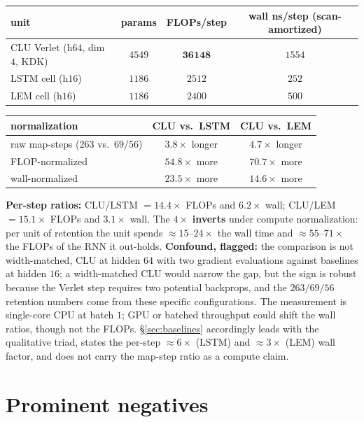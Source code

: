\documentclass{article}
\begin{document}
\begin{center}\footnotesize
\begin{tabular}{lccc}
\toprule
unit & params & FLOPs/step & wall ns/step (scan-amortized) \\
\midrule
CLU Verlet (h$64$, dim $4$, KDK) & $4549$ & $\mathbf{36148}$ & $1554$ \\
LSTM cell (h$16$) & $1186$ & $2512$ & $252$ \\
LEM cell (h$16$) & $1186$ & $2400$ & $500$ \\
\bottomrule
\end{tabular}
\end{center}

\begin{center}\footnotesize
\begin{tabular}{lcc}
\toprule
normalization & CLU vs.\ LSTM & CLU vs.\ LEM \\
\midrule
raw map-steps ($263$ vs.\ $69$/$56$) & $3.8\times$ longer & $4.7\times$ longer \\
FLOP-normalized & $\mathbf{54.8\times}$ more & $\mathbf{70.7\times}$ more \\
wall-normalized & $\mathbf{23.5\times}$ more & $\mathbf{14.6\times}$ more \\
\bottomrule
\end{tabular}
\end{center}

\textbf{Per-step ratios:} CLU/LSTM $=14.4\times$ FLOPs and $6.2\times$ wall; CLU/LEM $=15.1\times$ FLOPs and $3.1\times$ wall. The $4\times$ \textbf{inverts} under compute normalization: per unit of retention the unit spends $\approx15$--$24\times$ the wall time and $\approx55$--$71\times$ the FLOPs of the RNN it out-holds. \textbf{Confound, flagged:} the comparison is not width-matched, CLU at hidden $64$ with two gradient evaluations against baselines at hidden $16$; a width-matched CLU would narrow the gap, but the sign is robust because the Verlet step requires two potential backprops, and the $263/69/56$ retention numbers come from these specific configurations. The measurement is single-core CPU at batch $1$; GPU or batched throughput could shift the wall ratios, though not the FLOPs. \S\ref{sec:baselines} accordingly leads with the qualitative triad, states the per-step $\approx6\times$ (LSTM) and $\approx3\times$ (LEM) wall factor, and does not carry the map-step ratio as a compute claim.

\section{Prominent negatives}\label{app:neg}
\end{document}
